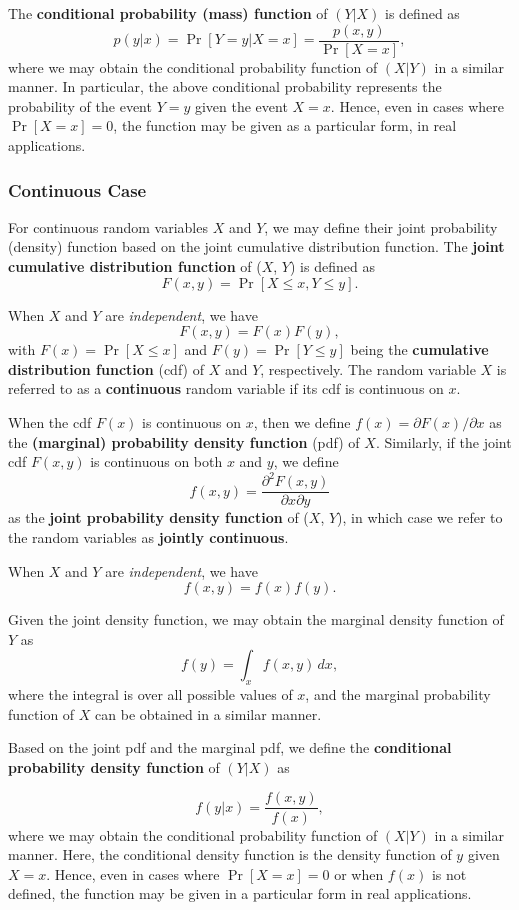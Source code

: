 \documentclass[]{book}
\theoremstyle{definition}
\theoremstyle{definition}
\theoremstyle{definition}
\theoremstyle{remark}
\begin{document}
The \textbf{conditional probability (mass) function} of \((Y|X)\) is
defined as \[p(y|x) =\Pr[Y=y|X=x]= \frac{p(x,y)}{\Pr[X=x]},\] where we
may obtain the conditional probability function of \((X|Y)\) in a
similar manner. In particular, the above conditional probability
represents the probability of the event \(Y=y\) given the event \(X=x\).
Hence, even in cases where \(\Pr[X=x]=0\), the function may be given as
a particular form, in real applications.

\subsubsection{Continuous Case}\label{continuous-case}

For continuous random variables \(X\) and \(Y\), we may define their
joint probability (density) function based on the joint cumulative
distribution function. The \textbf{joint cumulative distribution
function} of (\(X\), \(Y\)) is defined as
\[F(x,y) = \Pr[X\leq x, Y\leq y].\]

When \(X\) and \(Y\) are \emph{independent}, we have
\[F(x,y)=F(x)F(y),\] with \(F(x)=\Pr[X\leq x]\) and
\(F(y)=\Pr[Y\leq y]\) being the \textbf{cumulative distribution
function} (cdf) of \(X\) and \(Y\), respectively. The random variable
\(X\) is referred to as a \textbf{continuous} random variable if its cdf
is continuous on \(x\).

When the cdf \(F(x)\) is continuous on \(x\), then we define
\(f(x)=\partial F(x)/\partial x\) as the \textbf{(marginal) probability
density function} (pdf) of \(X\). Similarly, if the joint cdf \(F(x,y)\)
is continuous on both \(x\) and \(y\), we define
\[f(x,y)=\frac{\partial^2 F(x,y)}{\partial x\partial y}\] as the
\textbf{joint probability density function} of (\(X\), \(Y\)), in which
case we refer to the random variables as \textbf{jointly continuous}.

When \(X\) and \(Y\) are \emph{independent}, we have
\[f(x,y)=f(x)f(y).\]

Given the joint density function, we may obtain the marginal density
function of \(Y\) as \[f(y)=\int_x f(x,y)\,dx,\] where the integral is
over all possible values of \(x\), and the marginal probability function
of \(X\) can be obtained in a similar manner.

Based on the joint pdf and the marginal pdf, we define the
\textbf{conditional probability density function} of \((Y|X)\) as

\[f(y|x) = \frac{f(x,y)}{f(x)},\] where we may obtain the conditional
probability function of \((X|Y)\) in a similar manner. Here, the
conditional density function is the density function of \(y\) given
\(X=x\). Hence, even in cases where \(\Pr[X=x]=0\) or when \(f(x)\) is
not defined, the function may be given in a particular form in real
applications.
\end{document}
